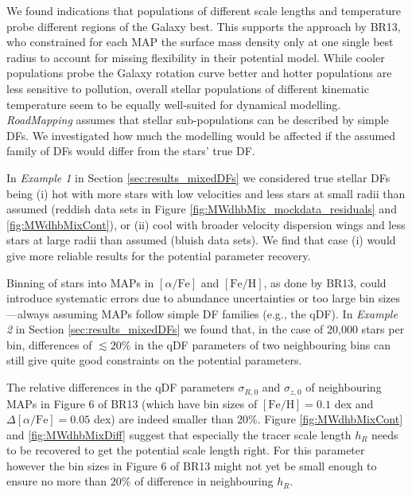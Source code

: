 \documentclass[iop,revtex4]{emulateapj}
\newcommand{\MAP}{MAP}
\newcommand{\MAPs}{MAPs}
\newcommand{\RM}{{\sl RoadMapping}}
\begin{document}
We found indications that populations of different scale lengths and temperature probe different regions of the Galaxy best. This supports the approach by BR13, who constrained for each \MAP{} the surface mass density only at one single best radius to account for missing flexibility in their potential model. While cooler populations probe the Galaxy rotation curve better and hotter populations are less sensitive to pollution, overall stellar populations of different kinematic temperature seem to be equally well-suited for dynamical modelling.\\

 \RM{} assumes that stellar sub-populations can be described by simple DFs. We investigated how much the modelling would be affected if the assumed family of DFs would differ from the stars' true DF.

In \emph{Example 1} in Section \ref{sec:results_mixedDFs} we considered true stellar DFs being (i) hot with more stars with low velocities and less stars at small radii than assumed (reddish data sets in Figure \ref{fig:MWdhbMix_mockdata_residuals} and \ref{fig:MWdhbMixCont}), or (ii) cool with broader velocity dispersion wings and less stars at large radii than assumed (bluish data sets). We find that case (i) would give more reliable results for the potential parameter recovery.

Binning of stars into \MAPs{} in $[\alpha/\mathrm{Fe}]$ and $[\mathrm{Fe}/\mathrm{H}]$, as done by BR13, could introduce systematic errors due to abundance uncertainties or too large bin sizes---always assuming \MAPs{} follow simple DF families (e.g., the qDF). In \emph{Example 2} in Section \ref{sec:results_mixedDFs} we found that, in the case of 20,000 stars per bin, differences of $\lesssim 20\%$ in the qDF parameters of two neighbouring bins can still give quite good constraints on the potential parameters.

The relative differences in the qDF parameters $\sigma_{R,0}$ and $\sigma_{z,0}$ of neighbouring \MAPs{} in Figure 6 of BR13 (which have bin sizes of $[\mathrm{Fe}/\mathrm{H}] = 0.1$ dex and $\Delta [\alpha/\mathrm{Fe}] = 0.05$ dex) are indeed smaller than $20\%$. Figure \ref{fig:MWdhbMixCont} and \ref{fig:MWdhbMixDiff} suggest that especially the tracer scale length $h_R$ needs to be recovered to get the potential scale length right. For this parameter however the bin sizes in Figure 6 of BR13 might not yet be small enough to ensure no more than $20\%$ of difference in neighbouring $h_R$.
\end{document}
